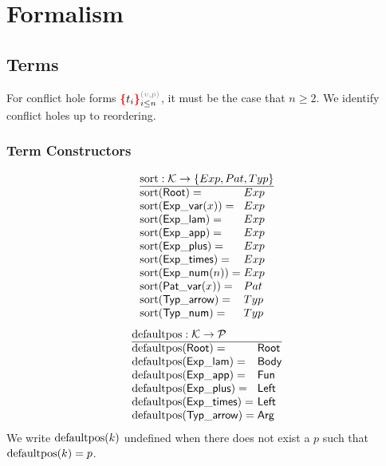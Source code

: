 \section{Formalism}


\subsection{Terms}

\figureTermSyntaxContent

For conflict hole forms $\conflictHole[i \leq n]{t_i}{v}{p}$,
it must be the case that $n \geq 2$.
We identify conflict holes up to reordering.


\subsubsection{Term Constructors}

\[
  \arraycolsep=0pt
  \begin{array}{ll}
    \multicolumn{2}{l}{\sortOp : \K \to \SetOf{Exp, Pat, Typ}} \\
    \hline
    \sort{\Root}={} & Exp \\
    \sort{\ExpVar(x)}={} & Exp \\
    \sort{\ExpLam}={} & Exp \\
    \sort{\ExpApp}={} & Exp \\
    \sort{\ExpPlus}={} & Exp \\
    \sort{\ExpTimes}={} & Exp \\
    \sort{\ExpNum(n)}={} & Exp \\
    \sort{\PatVar(x)}={} & Pat \\
    \sort{\TypArrow}={} & Typ \\
    \sort{\TypNum}={} & Typ \\
  \end{array}
\]
%
\figureArityContent
%
\[
  \arraycolsep=0pt
  \begin{array}{ll}
    \multicolumn{2}{l}{\defaultposOp : \K \to \P} \\
    \hline
    \defaultpos{\Root}={} & \Root \\
    \defaultpos{\ExpLam}={} & \LamBody \\
    \defaultpos{\ExpApp}={} & \AppFun \\
    \defaultpos{\ExpPlus}={} & \PlusLeft \\
    \defaultpos{\ExpTimes}={} & \TimesLeft \\
    \defaultpos{\TypArrow}={} & \ArrowArg \\
  \end{array}
\]
%
We write $\operatorname{\text{defaultpos}}\mathopen{}\left(k\right)\mathclose{}$ undefined when there does not exist a $p$ such that $\operatorname{\text{defaultpos}}\mathopen{}\left(k\right)\mathclose{} = p$.

